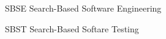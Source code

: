 \begin{siglas}
  \item[SBSE] Search-Based Software Engineering
  \item[SBST] Search-Based Softare Testing
\end{siglas}
